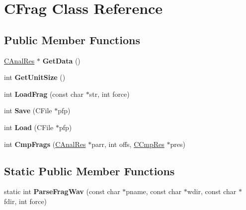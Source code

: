 \hypertarget{class_c_frag}{\section{C\-Frag Class Reference}
\label{class_c_frag}
}
\subsection*{Public Member Functions}
\begin{DoxyCompactItemize}
\item 
\hypertarget{class_c_frag_af22ef39b5834540512247c326d785ecf}{\hyperlink{class_c_anal_res}{C\-Anal\-Res} $\ast$ {\bfseries Get\-Data} ()}\label{class_c_frag_af22ef39b5834540512247c326d785ecf}

\item 
\hypertarget{class_c_frag_a1a2bf9728ed2d9e881339e5a0ba72011}{int {\bfseries Get\-Unit\-Size} ()}\label{class_c_frag_a1a2bf9728ed2d9e881339e5a0ba72011}

\item 
\hypertarget{class_c_frag_a0ea18de515f1fb8117e536f093cc29a3}{int {\bfseries Load\-Frag} (const char $\ast$str, int force)}\label{class_c_frag_a0ea18de515f1fb8117e536f093cc29a3}

\item 
\hypertarget{class_c_frag_a77a804310a7106a1842a1c1639672504}{int {\bfseries Save} (C\-File $\ast$pfp)}\label{class_c_frag_a77a804310a7106a1842a1c1639672504}

\item 
\hypertarget{class_c_frag_a76def88583fd75f622ec810893663fa9}{int {\bfseries Load} (C\-File $\ast$pfp)}\label{class_c_frag_a76def88583fd75f622ec810893663fa9}

\item 
\hypertarget{class_c_frag_a06744bb74b2c699ad678b36a38fe2dee}{int {\bfseries Cmp\-Frags} (\hyperlink{class_c_anal_res}{C\-Anal\-Res} $\ast$parr, int offs, \hyperlink{class_c_cmp_res}{C\-Cmp\-Res} $\ast$pres)}\label{class_c_frag_a06744bb74b2c699ad678b36a38fe2dee}

\end{DoxyCompactItemize}
\subsection*{Static Public Member Functions}
\begin{DoxyCompactItemize}
\item 
\hypertarget{class_c_frag_a2d01e8516c41d26d5dc2491618f30d28}{static int {\bfseries Parse\-Frag\-Wav} (const char $\ast$pname, const char $\ast$wdir, const char $\ast$fdir, int force)}\label{class_c_frag_a2d01e8516c41d26d5dc2491618f30d28}

\end{DoxyCompactItemize}
